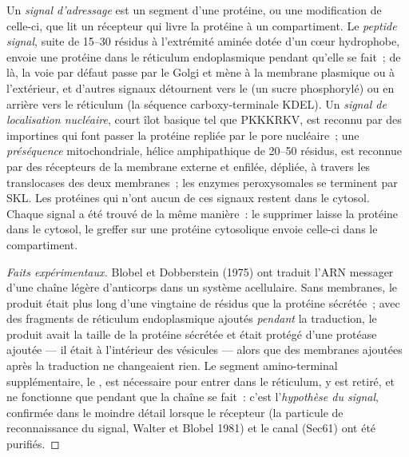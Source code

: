\begin{definition}\label{def:b3:membrane-traffic:signals}
Un \emph{signal d'adressage} est un segment d'une protéine, ou une
modification de celle-ci, que lit un récepteur qui livre la protéine à
un compartiment. Le \emph{peptide signal}, suite de
\numrange{15}{30} résidus à l'extrémité aminée dotée d'un cœur
hydrophobe, envoie une protéine dans le réticulum endoplasmique pendant
qu'elle se fait~; de là, la voie par défaut passe par le Golgi et mène
à la membrane plasmique ou à l'extérieur, et d'autres signaux détournent
vers le  (un sucre phosphorylé) ou en arrière vers le réticulum
(la séquence carboxy-terminale KDEL). Un \emph{signal de localisation
nucléaire}, court îlot basique tel que PKKKRKV, est reconnu par des
importines qui font passer la protéine repliée par le pore nucléaire~;
une \emph{préséquence} mitochondriale, hélice amphipathique de
\numrange{20}{50} résidus, est reconnue par des récepteurs de la
membrane externe et enfilée, dépliée, à travers les translocases des
deux membranes~; les enzymes peroxysomales se terminent par SKL. Les
protéines qui n'ont aucun de ces signaux restent dans le cytosol.
Chaque signal a été trouvé de la même manière~: le supprimer laisse la
protéine dans le cytosol, le greffer sur une protéine cytosolique
envoie celle-ci dans le compartiment.
\end{definition}

\begin{proof}[Faits expérimentaux]
Blobel et Dobberstein (1975) ont traduit l'ARN messager d'une chaîne
légère d'anticorps dans un système acellulaire. Sans membranes, le
produit était plus long d'une vingtaine de résidus que la protéine
sécrétée~; avec des fragments de réticulum endoplasmique ajoutés
\emph{pendant} la traduction, le produit avait la taille de la protéine
sécrétée et était protégé d'une protéase ajoutée --- il était à
l'intérieur des vésicules --- alors que des membranes ajoutées après la
traduction ne changeaient rien. Le segment amino-terminal
supplémentaire, le , est nécessaire pour entrer dans le
réticulum, y est retiré, et ne fonctionne que pendant que la chaîne se
fait~: c'est l'\emph{hypothèse du signal}, confirmée dans le moindre
détail lorsque le récepteur (la particule de reconnaissance du signal,
Walter et Blobel 1981) et le canal (Sec61) ont été purifiés.
\end{proof}

